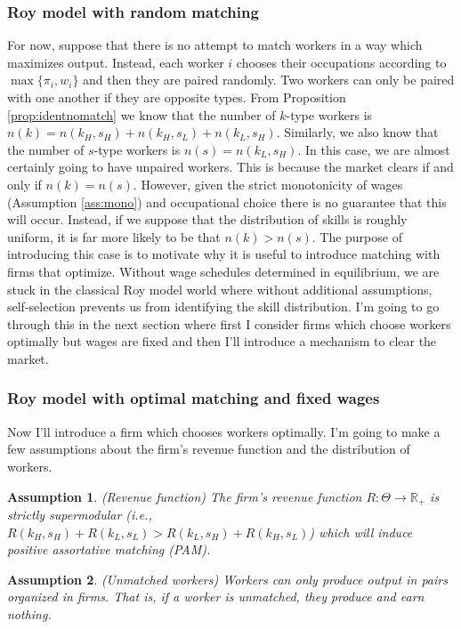 \documentclass[12 pt]{article}
\newtheorem{assumption}{Assumption} %
\begin{document}
\subsubsection{Roy model with random matching}

For now, suppose that there is no attempt to match workers in a way which maximizes output. Instead, each worker $i$ chooses their occupations according to $\max\{\pi_i,w_i\}$ and then they are paired randomly. Two workers can only be paired with one another if they are opposite types. From Proposition \ref{prop:identnomatch} we know that the number of $k$-type workers is $n(k) = n(k_H,s_H) + n(k_H,s_L) + n(k_L,s_H)$. Similarly, we also know that the number of $s$-type workers is $n(s)=n(k_L,s_H)$. In this case, we are almost certainly going to have unpaired workers. This is because the market clears if and only if $n(k) = n(s)$. However, given the strict monotonicity of wages (Assumption \ref{ass:mono}) and occupational choice there is no guarantee that this will occur. Instead, if we suppose that the distribution of skills is roughly uniform, it is far more likely to be that $n(k)>n(s)$. The purpose of introducing this case is to motivate why it is useful to introduce matching with firms that optimize. Without wage schedules determined in equilibrium, we are stuck in the classical Roy model world where without additional assumptions, self-selection prevents us from identifying the skill distribution. I'm going to go through this in the next section where first I consider firms which choose workers optimally but wages are fixed and then I'll introduce a mechanism to clear the market.

\subsubsection{Roy model with optimal matching and fixed wages}

Now I'll introduce a firm which chooses workers optimally. I'm going to make a few assumptions about the firm's revenue function and the distribution of workers.

\begin{assumption}(Revenue function)
	The firm's revenue function $R:\Theta\to\mathbb{R}_+$ is strictly supermodular (i.e., $R(k_H,s_H) + R(k_L,s_L) > R(k_L,s_H) + R(k_H,s_L)$) which will induce positive assortative matching (PAM). 
	\label{ass:rev}
\end{assumption}

\begin{assumption}(Unmatched workers)
	Workers can only produce output in pairs organized in firms. That is, if a worker is unmatched, they produce and earn nothing.
	\label{ass:unmatched}
\end{assumption}
\end{document}
